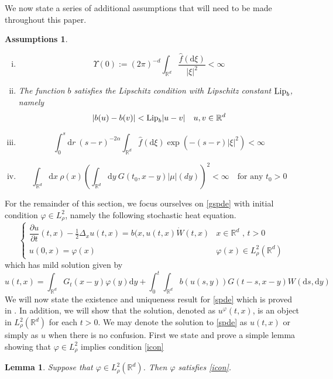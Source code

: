 \documentclass{article}
\newtheorem{assumptions}{Assumptions}[section]
\newtheorem{lemma}{Lemma}[section]
\numberwithin{equation}{section}
\newcommand{\lip}{\textup{Lip}_b}
\newcommand{\R}{\mathbb{R}}
\newcommand{\ud}{\ensuremath{\mathrm{d}}}
\begin{document}
We now state a series of additional assumptions that will need to be made throughout this paper.

\begin{assumptions} 
\begin{enumerate}[(i)]
	\item $$\Upsilon(0) := (2\pi)^{-d}\int_{\R^d}\dfrac{\hat f(\ud \xi)}{|\xi|^2} < \infty$$ \label{dalcon0} 
	\item The function $b$ satisfies the Lipschitz condition with Lipschitz constant $\lip$, namely $$ |b(u)-b(v)|< \lip |u-v| \quad u,v \in \R^d $$ \label{lipcon}
	\item $$\int_0^s \ud r \: (s-r)^{-2\alpha} \int_{\R^{d}} \hat f(\ud \xi) \exp\left(-(s-r)|\xi|^2 \right) < \infty $$ \label{fcon}
	\item $$\int_{\R^d}\ud x \: \rho(x)\left(\int_{\R^d}\ud y \: G(t_0,x-y)|\mu|(dy) \right)^2 < \infty \quad \text{for any $t_0 >0$}$$ \label{gicon}
\end{enumerate}
\end{assumptions}

For the remainder of this section, we focus ourselves on \eqref{gspde} with initial condition $\varphi \in L^2_\rho$, namely the following stochastic heat equation. 
\begin{equation}
\begin{cases}
\dfrac{\partial u}{\partial t}(t,x)-\frac{1}{2}\Delta_x u(t,x) = b(x,u(t,x)\dot W(t,x) & \text{$x\in \mathbb R^d$ , $t>0$}
\\ u(0,x)=\varphi(x) & \varphi(x) \in L^2_\rho(\mathbb R^d)
\end{cases}  \label{spde}
\end{equation}
which has mild solution given by
\begin{equation}
u(t,x)=\int_{\mathbb R^d}G_t(x-y)\varphi(y)\ud y + \int_0^t\int_{\mathbb R^d}b(u(s,y))G(t-s,x-y)W(\ud s,\ud y) \label{msol}
\end{equation}
We will now state the existence and uniqueness result for \eqref{spde} which is proved in \cite{CH16Comparison}. In addition, we will show that the solution, denoted as $u^\varphi(t,x)$, is an object in $L^2_\rho(\R^d)$ for each $t>0$. We may denote the solution to \eqref{spde} as $u(t,x)$ or simply as $u$ when there is no confusion. First we state and prove a simple lemma showing that $\varphi \in L^2_\rho$ implies condition \eqref{icon}\\

\begin{lemma} \textit{Suppose that $\varphi \in L^2_\rho(\R^d)$. Then $\varphi$ satisfies \eqref{icon}.} 
\end{lemma}
\end{document}
